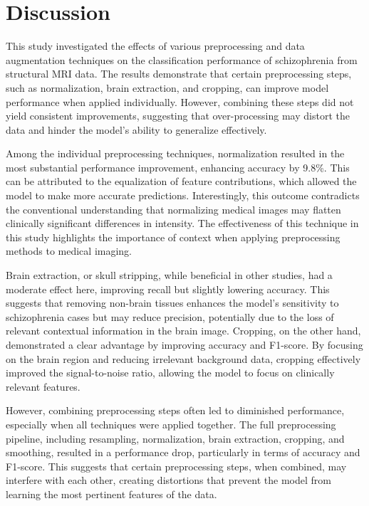 \section{Discussion}

This study investigated the effects of various preprocessing and data augmentation techniques on the classification performance of schizophrenia from structural MRI data. The results demonstrate that certain preprocessing steps, such as normalization, brain extraction, and cropping, can improve model performance when applied individually. However, combining these steps did not yield consistent improvements, suggesting that over-processing may distort the data and hinder the model's ability to generalize effectively.

Among the individual preprocessing techniques, normalization resulted in the most substantial performance improvement, enhancing accuracy by 9.8\%. This can be attributed to the equalization of feature contributions, which allowed the model to make more accurate predictions. Interestingly, this outcome contradicts the conventional understanding that normalizing medical images may flatten clinically significant differences in intensity. The effectiveness of this technique in this study highlights the importance of context when applying preprocessing methods to medical imaging.

Brain extraction, or skull stripping, while beneficial in other studies, had a moderate effect here, improving recall but slightly lowering accuracy. This suggests that removing non-brain tissues enhances the model's sensitivity to schizophrenia cases but may reduce precision, potentially due to the loss of relevant contextual information in the brain image. Cropping, on the other hand, demonstrated a clear advantage by improving accuracy and F1-score. By focusing on the brain region and reducing irrelevant background data, cropping effectively improved the signal-to-noise ratio, allowing the model to focus on clinically relevant features.

However, combining preprocessing steps often led to diminished performance, especially when all techniques were applied together. The full preprocessing pipeline, including resampling, normalization, brain extraction, cropping, and smoothing, resulted in a performance drop, particularly in terms of accuracy and F1-score. This suggests that certain preprocessing steps, when combined, may interfere with each other, creating distortions that prevent the model from learning the most pertinent features of the data.

